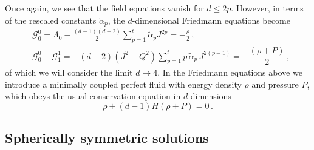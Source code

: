 \documentclass[aps,prd,preprint,nofootinbib]{revtex4-1}
\begin{document}
Once again, we see that the field equations vanish for $d \leq 2p$. However, in terms of the rescaled constants $\tilde{\alpha}_p$, the $d$-dimensional Friedmann equations become 
\begin{align}
& \mathcal{G}_{0}^{0}=\Lambda_0 - \frac{(d-1)(d-2) }{2} \sum_{p=1}^t \tilde{\alpha}_p J^{2p} = - \frac{\rho}{2} \,,\label{eq:fried1_t}\\
&              
  \mathcal{G}_{0}^{0}-  \mathcal{G}_{1}^{1} =  -(d-2) \left(J^2-Q^2\right) \sum_{p=1}^t  p \, \tilde{\alpha}_p \, J^{2(p-1)}  =  -\dfrac{\left(\rho + P\right)}{2}\,,\label{eq:fried2_t}
\end{align}
of which we will consider the limit $d\rightarrow4$.  In the Friedmann equations above we introduce a minimally coupled perfect fluid with energy density $\rho$ and pressure $P$, which obeys the usual conservation equation in $d$ dimensions
\begin{equation}
    \dot{\rho} +  (d-1) H (\rho + P) = 0 \label{eq:cons}\,.
\end{equation}

\subsection{Spherically symmetric solutions}\label{sec:SSS}
\end{document}
